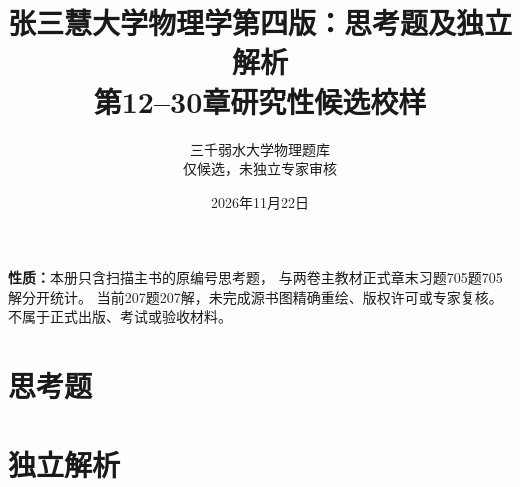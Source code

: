 \documentclass[UTF8,a4paper,11pt]{ctexart}
\title{张三慧大学物理学第四版：思考题及独立解析\\第12--30章研究性候选校样}
\author{三千弱水大学物理题库\\仅候选，未独立专家审核}
\date{2026年11月22日}
\begin{document}
\maketitle
\noindent\textbf{性质：}本册只含扫描主书的原编号思考题，
与两卷主教材正式章末习题705题705解分开统计。
当前207题207解，未完成源书图精确重绘、版权许可或专家复核。
不属于正式出版、考试或验收材料。
\tableofcontents
\clearpage
\part*{思考题}



















\clearpage
\part*{独立解析}



















\end{document}
